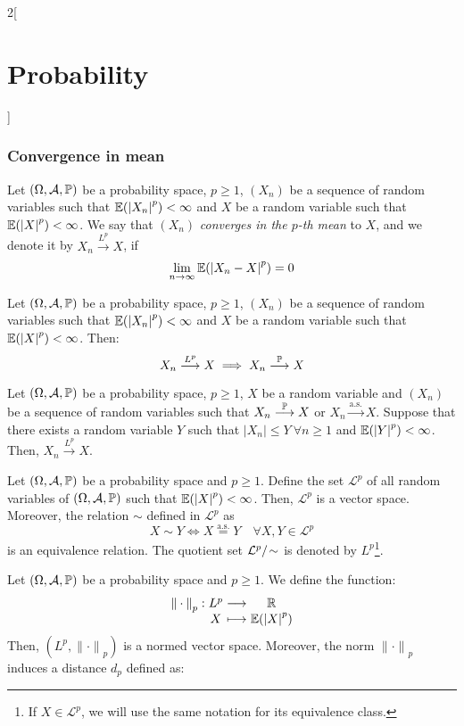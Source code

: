 \documentclass[../../../main_math.tex]{subfiles}
\begin{document}
\begin{multicols}{2}[\section{Probability}]
  \subsubsection{Convergence in mean}
  \begin{definition}
    Let $(\Omega,\mathcal{A},\mathbb{P})$ be a probability space, $p\geq 1$, $(X_n)$ be a sequence of random variables such that $\mathbb{E}({|X_n|}^p)<\infty$ and $X$ be a random variable such that $\mathbb{E}({|X|}^p)<\infty$. We say that $(X_n)$ \emph{converges in the $p$-th mean} to $X$, and we denote it by $X_n\overset{L^p}{\longrightarrow} X$, if  $$\lim_{n\to\infty}\mathbb{E}({|X_n-X|}^p)=0$$
  \end{definition}
  \begin{proposition}
    Let $(\Omega,\mathcal{A},\mathbb{P})$ be a probability space, $p\geq 1$, $(X_n)$ be a sequence of random variables such that $\mathbb{E}({|X_n|}^p)<\infty$ and $X$ be a random variable such that $\mathbb{E}({|X|}^p)<\infty$. Then:
    $$X_n\overset{L^p}{\longrightarrow} X\implies X_n\overset{\mathbb{P}}{\longrightarrow} X$$
  \end{proposition}
  \begin{theorem}
    Let $(\Omega,\mathcal{A},\mathbb{P})$ be a probability space, $p\geq 1$, $X$ be a random variable and $(X_n)$ be a sequence of random variables such that $X_n\overset{\mathbb{P}}{\longrightarrow}X$ or $X_n\overset{\text{a.s.}}{\longrightarrow}X$. Suppose that there exists a random variable $Y$ such that $|X_n|\leq Y\ \forall n\geq 1$ and $\mathbb{E}({|Y|}^p)<\infty$. Then, $X_n\overset{L^p}{\longrightarrow} X$.
  \end{theorem}
  \begin{lemma}
    Let $(\Omega,\mathcal{A},\mathbb{P})$ be a probability space and $p\geq 1$. Define the set $\mathcal{L}^p$ of all random variables of $(\Omega,\mathcal{A},\mathbb{P})$ such that $\mathbb{E}({|X|}^p)<\infty$. Then, $\mathcal{L}^p$ is a vector space. Moreover, the relation $\sim$ defined in $\mathcal{L}^p$ as $$X\sim Y\iff X\overset{\text{a.s.}}{=} Y\quad\forall X,Y\in\mathcal{L}^p$$ is an equivalence relation. The quotient set $\quot{\mathcal{L}^p}{\!\sim}$ is denoted by $L^p$\footnote{If $X\in\mathcal{L}^p$, we will use the same notation for its equivalence class.}.
  \end{lemma}
  \begin{proposition}
    Let $(\Omega,\mathcal{A},\mathbb{P})$ be a probability space and $p\geq 1$. We define the function:
    $$
      \function{{\|\cdot\|}_p}{L^p}{\RR}{X}{\Exp({|X|}^p)}
    $$
    Then, $(L^p,{\|\cdot\|}_p)$ is a normed vector space. Moreover, the norm ${\|\cdot\|}_p$ induces a distance $d_p$ defined as:

\end{proposition}
\end{multicols}
\end{document}

